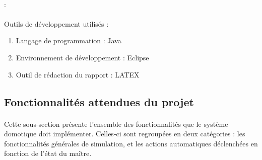 \paragraph{}

\paragraph{} :


\paragraph{} Outils de développement utilisés :
\begin{enumerate}
    \item Langage de programmation : Java
    \item Environnement de développement : Eclipse
    \item Outil de rédaction du rapport : LATEX
\end{enumerate}

\subsection{Fonctionnalités attendues du projet}
\label{sec:spec2}

\paragraph{} Cette sous-section présente l'ensemble des fonctionnalités que le système 
domotique doit implémenter. Celles-ci sont regroupées en deux catégories : les 
fonctionnalités générales de simulation, et les actions automatiques déclenchées en 
fonction de l'état du maître.

